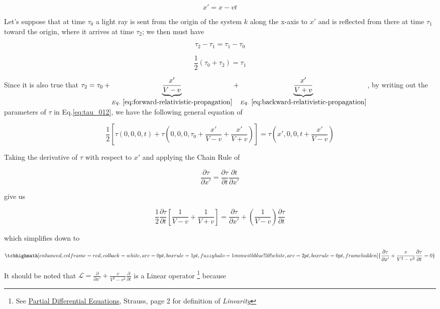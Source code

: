 \[
    x' = x - vt
\]

Let's suppose that at time $\tau_0$ a light ray is sent from the origin of the system $k$ along the x-axis to $x'$ and
is reflected from there at time $\tau_1$ toward the origin, where it arrives at time $\tau_2$; we then must have

\[
    \tau_2 - \tau_1 = \tau_1 - \tau_0
\]

\begin{equation} \label{eq:tau_012}
\frac{1}{2}(\tau_0 + \tau_2) = \tau_1
\end{equation}

Since it is also true that
$\tau_2 = \tau_0 + \underbrace{\frac{x'}{V - v}}_{Eq.~\ref{eq:forward-relativistic-propagation}} + \underbrace{\frac{x'}{V + v}}_{Eq.~\ref{eq:backward-relativistic-propagation}}$,
by writing out the parameters of $\tau$ in Eq.\ref{eq:tau_012}, we have the following general equation of

\begin{equation}
    \frac{1}{2}\left[ \tau(0, 0, 0, t) + \tau\left( 0, 0, 0, \tau_0 + \frac{x'}{V - v} + \frac{x'}{V + v} \right) \right] = \tau\left( x', 0, 0, t + \frac{x'}{V -v} \right)
\end{equation}

Taking the derivative of $\tau$ with respect to $x'$ and applying the Chain Rule of

\[
    \frac{\partial\tau}{\partial x'} = \frac{\partial\tau}{\partial t}\frac{\partial t}{\partial x'}
\]

give us

\begin{equation}
    \frac{1}{2}\frac{\partial\tau}{\partial t}\left[ \frac{1}{V - v} + \frac{1}{V + v} \right] = \frac{\partial\tau}{\partial x'} + \left( \frac{1}{V - v} \right)\frac{\partial\tau}{\partial t}
\end{equation}

which simplifies down to

\begin{equation}\label{eq:tau_t_general}
\tcbhighmath[
    enhanced,colframe=red,colback=white,arc=0pt,boxrule=1pt,
    fuzzy halo=1mm with blue!50!white,
    arc=2pt,
    boxrule=0pt,
    frame hidden
]{
    \frac{\partial\tau}{\partial x'} + \frac{v}{V^2 - v^2}\frac{\partial\tau}{\partial t} = 0
}
\end{equation}

It should be noted that $\mathscr{L} = \frac{\partial}{\partial x'} + \frac{v}{V^2 - v^2}\frac{\partial}{\partial t}$
is a Linear operator
\footnote{See \href{https://trello.com/c/5L46ePJQ}{Partial Differential Equations}, Strauss, page 2 for definition of \textit{Linearity}}
because

